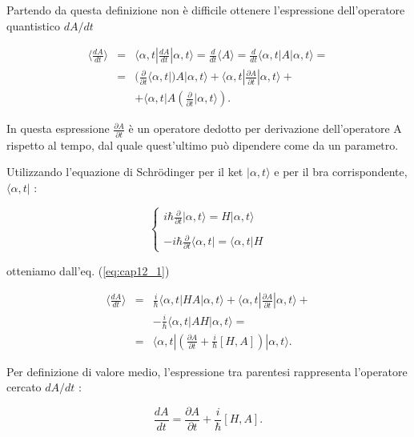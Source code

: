 \documentclass[a4paper,12pt,oneside]{book}
\begin{document}
Partendo da questa definizione non è difficile ottenere l'espressione dell'operatore quantistico $dA/dt$

\begin{eqnarray}
\label{eq:cap12_1}
\langle \frac{dA}{dt} \rangle &=& \langle \alpha,t| \frac{dA}{dt}| \alpha,t \rangle = \frac{d}{dt} \langle A \rangle = \frac{d}{dt} \langle \alpha ,t |A| \alpha ,t\rangle= \nonumber\\
&=&(\frac{\partial }{\partial{t}}\langle \alpha,t|) A|\alpha,t \rangle + \langle \alpha,t| \frac{\partial A}{\partial{t}}|\alpha,t \rangle + \\
& &+\langle\alpha,t|A (\frac{\partial }{\partial{t}}|\alpha,t\rangle).\nonumber
\end{eqnarray} 

In questa espressione $\frac{\partial A}{\partial{t}}$ è un operatore dedotto per derivazione dell'operatore A rispetto al tempo, dal quale quest'ultimo può dipendere come da un parametro.

Utilizzando l'equazione di Schr\"{o}dinger per il ket $|\alpha,t\rangle$ e per il bra corrispondente,   $\langle\alpha,t|$ :

\begin{equation}
\begin{cases}
\displaystyle{i\hbar\frac{\partial }{\partial{t}}|\alpha,t\rangle= H|\alpha,t\rangle }\\
\\
\displaystyle{-i\hbar\frac{\partial }{\partial{t}}\langle\alpha,t|= \langle\alpha,t|H } 
\end{cases}
\end{equation}

otteniamo dall'eq. (\ref{eq:cap12_1})

\begin{eqnarray}
\langle\frac{dA}{dt} \rangle &=& \frac{i}{\hbar} \langle\alpha,t|HA|\alpha,t\rangle + \langle \alpha,t|\frac{\partial A}{\partial{t}}|\alpha,t \rangle + \nonumber \\
& &-\frac{i}{\hbar} \langle \alpha,t|AH|\alpha,t\rangle=  \nonumber\\
&=& \langle \alpha,t| (\frac{\partial A}{\partial{t}} + \frac{i}{\hbar}[H,A] ) |\alpha,t\rangle .
\end{eqnarray}


Per definizione di valore medio, l'espressione tra parentesi rappresenta l'operatore cercato $dA/dt$ :

\begin{equation} \label{eq:cap12_2}
\frac{dA}{dt}= \frac{\partial A}{\partial{t}}+ \frac{i}{\hbar}[H,A].
\end{equation}
\end{document}
